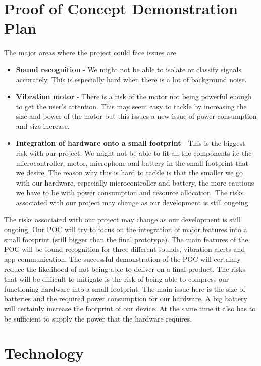 \documentclass{article}
\begin{document}
\section{Proof of Concept Demonstration Plan}

The major areas where the project could face issues are 
\begin{itemize}
	\item \textbf{Sound recognition} - We might not be able to isolate or classify signals accurately. This is especially hard when there is a lot of background noise. 
	\item \textbf{Vibration motor} - There is a risk of the motor not being powerful enough to get the user’s attention. This may seem easy to tackle by increasing the size and power of the motor but this issues a new issue of power consumption and size increase.
	\item \textbf{Integration of hardware onto a small footprint} - This is the biggest risk with our project. We might not be able to fit all the components i.e the microcontroller, motor, microphone and battery in the small footprint that we desire. The reason why this is hard to tackle is that the smaller we go with our hardware, especially microcontroller and battery, the more cautious we have to be with power consumption and resource allocation.
	The risks associated with our project may change as our development is still ongoing. 
\end{itemize} 

The risks associated with our project may change as our development is still ongoing. 
Our POC will try to focus on the integration of major features into a small footprint (still bigger than the final prototype). The main features of the POC will be sound recognition for three different sounds, vibration alerts and app communication. The successful  demonstration of the POC will certainly reduce the likelihood of not being able to deliver on a final product. The risks that will be difficult to mitigate is the risk of being able to compress our functioning hardware into a small footprint. The main issue here is the size of batteries and the required power consumption for our hardware. A big battery will certainly increase the footprint of our device. At the same time it also has to be sufficient to supply the power that the hardware requires.  


\section{Technology}
\end{document}
